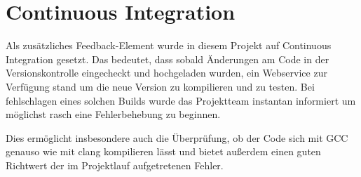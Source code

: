 \section{Continuous Integration}
Als zusätzliches Feedback-Element wurde in diesem Projekt auf Continuous Integration gesetzt. Das bedeutet, dass sobald Änderungen am Code in der Versionskontrolle eingecheckt und hochgeladen wurden, ein Webservice zur Verfügung stand um die neue Version zu kompilieren und zu testen. Bei fehlschlagen eines solchen Builds wurde das Projektteam instantan informiert um möglichst rasch eine Fehlerbehebung zu beginnen.

Dies ermöglicht insbesondere auch die Überprüfung, ob der Code sich mit GCC genauso wie mit clang kompilieren lässt und bietet außerdem einen guten Richtwert der im Projektlauf aufgetretenen Fehler. 
